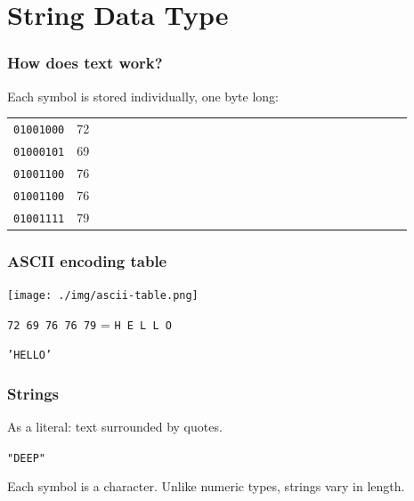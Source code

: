 \documentclass[11pt]{beamer}
\begin{document}
\section{String Data Type}

\begin{frame}
  \frametitle{How does text work?}
  \Enlarge

  \begin{itemize}
  \myitem  Each symbol is stored individually, one byte long: \\
    \begin{tabular}{*{27}{l}}
      \texttt{01001000} & 72 \\
      \texttt{01000101} & 69 \\
      \texttt{01001100} & 76 \\
      \texttt{01001100} & 76 \\
      \texttt{01001111} & 79 \\
    \end{tabular}
  \end{itemize}
\end{frame}

\begin{frame}
  \frametitle{ASCII encoding table}
  \Enlarge
  \texttt{[image: ./img/ascii-table.png]} \pause

  \texttt{72 69 76 76 79} = \texttt{H E L L O} \pause

  \texttt{'HELLO'}
\end{frame}

\begin{frame}
  \frametitle{Strings}
  \Enlarge

  \begin{itemize}
  \myitem  As a literal:  text surrounded by quotes.
    \begin{itemize}
    \mysubitem  \texttt{"DEEP"}
    \end{itemize} \pause
  \myitem  Each symbol is a character. \pause
  \myitem  Unlike numeric types, strings vary in length.
  \end{itemize}
\end{frame}
\end{document}
